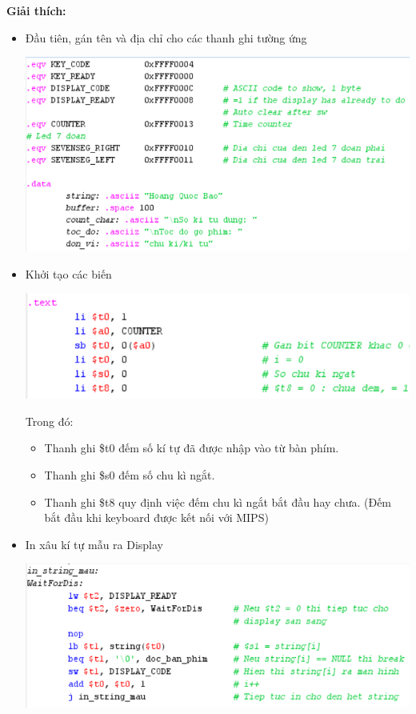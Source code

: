 \documentclass[12pt,a4paper,oneside]{article}
\begin{document}
\pagebreak
\textbf{Giải thích:}
\begin{itemize}
\item Đầu tiên, gán tên và địa chỉ cho các thanh ghi tường ứng
\begin{center}
\includegraphics[scale=1]{image/b31}
\end{center}
\item Khởi tạo các biến
\begin{center}
\includegraphics[scale=1]{image/b32}
\end{center}
Trong đó:
\begin{itemize}
\item Thanh ghi \$t0 đếm số kí tự đã được nhập vào từ bàn phím.
\item Thanh ghi \$s0 đếm số chu kì ngắt.
\item Thanh ghi \$t8 quy định việc đếm chu kì ngắt bắt đầu hay chưa. (Đếm bắt đầu khi keyboard được kết nối với MIPS)
\end{itemize}
\item In xâu kí tự mẫu ra Display
\begin{center}
\includegraphics[scale=1]{image/b33}

\end{center}
\end{itemize}
\end{document}
